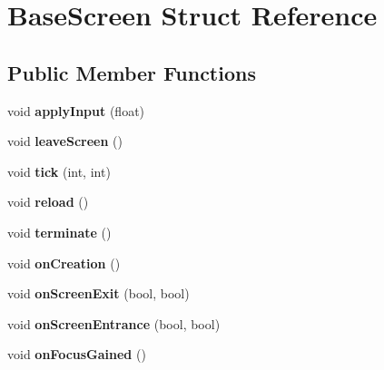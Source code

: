 \hypertarget{struct_base_screen}{}\section{Base\+Screen Struct Reference}
\label{struct_base_screen}
\subsection*{Public Member Functions}
\begin{DoxyCompactItemize}
\item 
\mbox{\label{struct_base_screen_afcc7e56464c3e84fd65d5fe707af3008}} 
void {\bfseries apply\+Input} (float)
\item 
\mbox{\label{struct_base_screen_ae92c700d9a61a5cf802883a64e2d0afe}} 
void {\bfseries leave\+Screen} ()
\item 
\mbox{\label{struct_base_screen_ac31fd68d74e8c0731176c365b04f9e36}} 
void {\bfseries tick} (int, int)
\item 
\mbox{\label{struct_base_screen_ab664b71bd82734976fb1133a7dc61772}} 
void {\bfseries reload} ()
\item 
\mbox{\label{struct_base_screen_af01a1ddd43991f5e1b0387c49c02f877}} 
void {\bfseries terminate} ()
\item 
\mbox{\label{struct_base_screen_aa55ac0179a191d9396caf1a9c1eb54ea}} 
void {\bfseries on\+Creation} ()
\item 
\mbox{\label{struct_base_screen_a6e6791bcc376d8331505854a72e6c9b6}} 
void {\bfseries on\+Screen\+Exit} (bool, bool)
\item 
\mbox{\label{struct_base_screen_abaa4b5527585e19e1a6e825a0daa3705}} 
void {\bfseries on\+Screen\+Entrance} (bool, bool)
\item 
\mbox{\label{struct_base_screen_a3f231c390301e8b1c362c17d3fdc4075}} 
void {\bfseries on\+Focus\+Gained} ()
\item 
\mbox{\label{struct_base_screen_a5b50ff681918538d682dee190496565e}} 

\end{DoxyCompactItemize}
